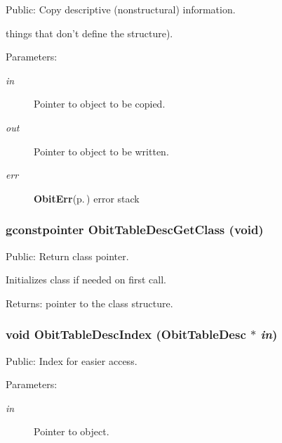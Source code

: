 Public: Copy descriptive (nonstructural) information. 

things that don't define the structure). \begin{Desc}
\item[Parameters:]
\begin{description}
\item[{\em in}]Pointer to object to be copied. \item[{\em out}]Pointer to object to be written. \item[{\em err}]{\bf Obit\-Err}{\rm (p.\,\pageref{structObitErr})} error stack \end{description}
\end{Desc}
\subsubsection{\setlength{\rightskip}{0pt plus 5cm}gconstpointer Obit\-Table\-Desc\-Get\-Class (void)}\label{ObitTableDesc_8c_a5}


Public: Return class pointer. 

Initializes class if needed on first call. \begin{Desc}
\item[Returns:]pointer to the class structure. \end{Desc}
\subsubsection{\setlength{\rightskip}{0pt plus 5cm}void Obit\-Table\-Desc\-Index ({\bf Obit\-Table\-Desc} $\ast$ {\em in})}\label{ObitTableDesc_8c_a8}


Public: Index for easier access. 

\begin{Desc}
\item[Parameters:]
\begin{description}
\item[{\em in}]Pointer to object. \end{description}
\end{Desc}
